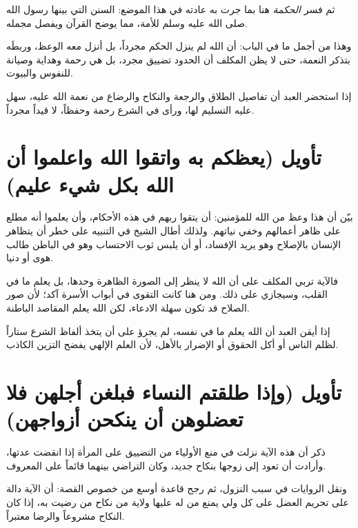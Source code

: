 ثم فسر \textit{الحكمة} هنا بما جرت به عادته في هذا الموضع: السنن التي بينها رسول الله صلى الله عليه وسلم للأمة، مما يوضح القرآن ويفصل مجمله.

وهذا من أجمل ما في الباب: أن الله لم ينزل الحكم مجرداً، بل أنزل معه الوعظ، وربطَه بتذكر النعمة، حتى لا يظن المكلف أن الحدود تضييق مجرد، بل هي رحمة وهداية وصيانة للنفوس والبيوت.

\begin{fawaid}
إذا استحضر العبد أن تفاصيل الطلاق والرجعة والنكاح والرضاع من نعمة الله عليه، سهل عليه التسليم لها، ورأى في الشرع رحمة وحفظاً، لا قيداً مجرداً.
\end{fawaid}

\section{تأويل (يعظكم به واتقوا الله واعلموا أن الله بكل شيء عليم)}
بيّن  أن هذا وعظ من الله للمؤمنين: أن يتقوا ربهم في هذه الأحكام، وأن يعلموا أنه مطلع على ظاهر أعمالهم وخفي نياتهم. ولذلك أطال الشيخ في التنبيه على خطر أن يتظاهر الإنسان بالإصلاح وهو يريد الإفساد، أو أن يلبس ثوب الاحتساب وهو في الباطن طالب هوى أو دنيا.

فالآية تربي المكلف على أن الله لا ينظر إلى الصورة الظاهرة وحدها، بل يعلم ما في القلب، وسيجازي على ذلك. ومن هنا كانت التقوى في أبواب الأسرة آكد؛ لأن صور الصلاح قد تكون سهلة الادعاء، لكن الله يعلم المقاصد الباطنة.

\begin{fawaid}
إذا أيقن العبد أن الله يعلم ما في نفسه، لم يجرؤ على أن يتخذ ألفاظ الشرع ستاراً لظلم الناس أو أكل الحقوق أو الإضرار بالأهل، لأن العلم الإلهي يفضح التزين الكاذب.
\end{fawaid}

\separator

\section{تأويل (وإذا طلقتم النساء فبلغن أجلهن فلا تعضلوهن أن ينكحن أزواجهن)}
ذكر  أن هذه الآية نزلت في منع الأولياء من التضييق على المرأة إذا انقضت عدتها، وأرادت أن تعود إلى زوجها بنكاح جديد، وكان التراضي بينهما قائماً على المعروف.

ونقل الروايات في سبب النزول، ثم رجح قاعدة أوسع من خصوص القصة: أن الآية دالة على تحريم العضل على كل ولي يمنع من له عليها ولاية من نكاح من رضيت به، إذا كان النكاح مشروعاً والرضا معتبراً.


